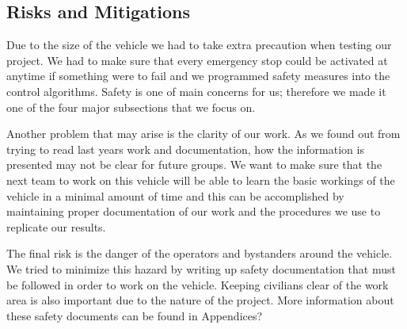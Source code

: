 		
\subsection{Risks and Mitigations}

Due to the size of the vehicle we had to take extra precaution when testing our project.  We had to make sure that every emergency stop could be activated at anytime if something were to fail and we programmed safety measures into the control algorithms.  Safety is one of main concerns for us; therefore we made it one of the four major subsections that we focus on.  

Another problem that may arise is the clarity of our work.  As we found out from trying to read last years work and documentation, how the information is presented may not be clear for future groups.  We want to make sure that the next team to work on this vehicle will be able to learn the basic workings of the vehicle in a minimal amount of time and this can be accomplished by maintaining proper documentation of our work and the procedures we use to replicate our results.

The final risk is the danger of the operators and bystanders around the vehicle.  We tried to minimize this hazard by writing up safety documentation that must be followed in order to work on the vehicle.  Keeping civilians clear of the work area is also important due to the nature of the project.  More information about these safety documents can be found in Appendices?
		
		
		
		
		
		